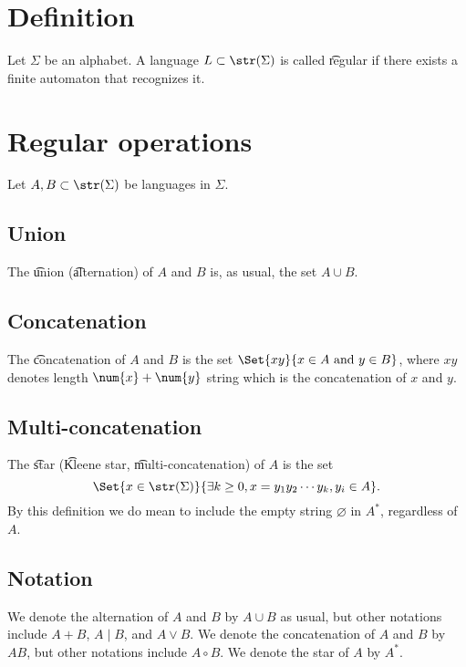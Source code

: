 
\section*{Definition}

Let $\Sigma $ be an alphabet.
A language $L \subset \str(\Sigma )$ is called \t{regular} if there exists a finite automaton that recognizes it.

\section*{Regular operations}

Let $A, B \subset \str(\Sigma )$ be languages in $\Sigma $.
  \subsection*  {Union  }

The \t{union} (\t{alternation}) of $A$ and $B$ is, as usual, the set $A \cup B$.
  \subsection*  {Concatenation  }

The \t{concatenation} of $A$ and $B$ is the set $\Set{xy}{x \in A \text{ and } y \in B}$, where $xy$ denotes length $\num{x}+\num{y}$ string which is the concatenation of $x$ and $y$.
  \subsection*  {Multi-concatenation  }

The \t{star} (\t{Kleene star}, \t{multi-concatenation}) of $A$ is the set
  \[
\Set{x \in \str(\Sigma )}{\exists k \geq 0, x = y_1y_2 \cdots y_k, y_i \in A}.
  \]
By this definition we do mean to include the empty string $\varnothing$ in $A^*$, regardless of $A$.

\subsection*{Notation}

We denote the alternation of $A$ and $B$ by $A \cup B$ as usual, but other notations include $A + B$, $A\mid B$, and $A \lor B$.
We denote the concatenation of $A$ and $B$ by $AB$, but other notations include $A \circ B$.
We denote the star of $A$ by $A^*$.

\blankpage
